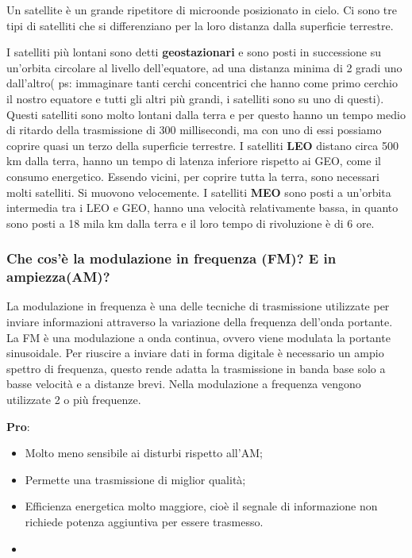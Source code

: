 Un satellite è un grande ripetitore di microonde posizionato in cielo. Ci sono tre tipi di satelliti che si
differenziano per la loro distanza dalla superficie terrestre.

I satelliti più lontani sono detti \textbf{geostazionari} e sono posti in successione su un’orbita circolare al livello dell’equatore, ad una distanza minima di 2 gradi uno dall'altro( ps: immaginare tanti cerchi
concentrici che hanno come primo cerchio il nostro equatore e tutti gli altri più grandi, i satelliti
sono su uno di questi). Questi satelliti sono molto lontani dalla terra e per questo hanno un tempo
medio di ritardo della trasmissione di 300 millisecondi, ma con uno di essi possiamo coprire quasi
un terzo della superficie terrestre. I satelliti \textbf{LEO} distano circa 500 km dalla terra, hanno un tempo di latenza inferiore rispetto ai GEO, come il consumo energetico. Essendo vicini, per coprire tutta la
terra, sono necessari molti satelliti. Si muovono velocemente. I satelliti \textbf{MEO} sono posti a un'orbita intermedia tra i LEO e GEO, hanno una velocità relativamente bassa, in quanto sono posti a 18 mila
km dalla terra e il loro tempo di rivoluzione è di 6 ore.

\subsubsection{Che cos'è la modulazione in frequenza (FM)? E in ampiezza(AM)?}

La modulazione in frequenza è una delle tecniche di trasmissione utilizzate per inviare informazioni
attraverso la variazione della frequenza dell’onda portante. La FM è una modulazione a onda
continua, ovvero viene modulata la portante sinusoidale.
Per riuscire a inviare dati in forma digitale è necessario un ampio spettro di frequenza, questo
rende adatta la trasmissione in banda base solo a basse velocità e a distanze brevi. Nella
modulazione a frequenza vengono utilizzate 2 o più frequenze.

\textbf{Pro}:

\begin{itemize}

\item Molto meno sensibile ai disturbi rispetto all’AM;
\item Permette una trasmissione di miglior qualità;
\item Efficienza energetica molto maggiore, cioè il segnale di informazione non richiede potenza aggiuntiva per essere trasmesso.
\item 

\end{itemize}

